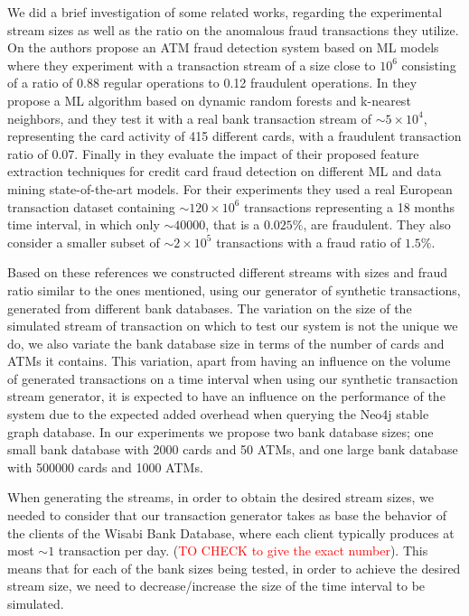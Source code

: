 We did a brief investigation of some related works, regarding the experimental stream sizes as well as the ratio on the anomalous fraud transactions they utilize. On \cite{exps-atmfrauddetectionstreamdata} the authors propose an ATM fraud detection system based on ML models where they experiment with a transaction stream of a size close to $10^{6}$ consisting of a ratio of 0.88 regular operations to 0.12 fraudulent operations. In \cite{exps-costsensitivepayment} they propose a ML algorithm based on dynamic random forests and k-nearest neighbors, and they test it with a real bank transaction stream of $\sim5 \times 10^{4}$, representing the card activity of 415 different cards, with a fraudulent transaction ratio of 0.07. Finally in \cite{exps-featureengineering} they evaluate the impact of their proposed feature extraction techniques for credit card fraud detection on different ML and data mining state-of-the-art models. For their experiments they used a real European transaction dataset containing $\sim120 \times 10^{6}$ transactions representing a 18 months time interval, in which only $\sim40000$, that is a $0.025\%$, are fraudulent. They also consider a smaller subset of $\sim 2 \times 10^{5}$ transactions with a fraud ratio of $1.5\%$.

Based on these references we constructed different streams with sizes and fraud ratio similar to the ones mentioned, using our generator of synthetic transactions, generated from different bank databases.
The variation on the size of the simulated stream of transaction on which to test our system is not the unique we do, we also variate the bank database size in terms of the number of cards and ATMs it contains. This variation, apart from having an influence on the volume of generated transactions on a time interval when using our synthetic transaction stream generator, it is expected to have an influence on the performance of the system due to the expected added overhead when querying the Neo4j stable graph database. In our experiments we propose two bank database sizes; one small bank database with 2000 cards and 50 ATMs, and one large bank database with 500000 cards and 1000 ATMs. 



When generating the streams, in order to obtain the desired stream sizes, we needed to consider that our transaction generator takes as base the behavior of the clients of the 
Wisabi Bank Database, where each client typically produces at most $\sim 1$ transaction per day. (\textcolor{red}{TO CHECK to give the exact number}). This means that for each of the bank sizes being tested, in order to achieve the desired stream size, we need to decrease/increase the size of the time interval to be simulated.



